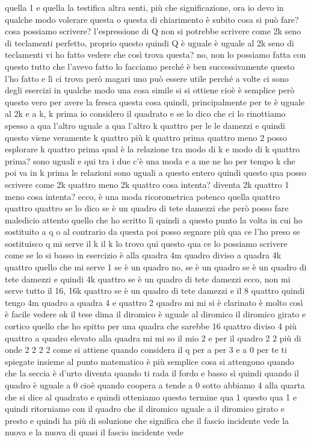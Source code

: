 \begin{soluzione}
{   quella 1 e quella la testifica altra senti, più che significazione, ora io devo in qualche modo volerare questa o questa di chiarimento è subito cosa si può fare? cosa possiamo scrivere? l'espressione di Q non si potrebbe scrivere come 2k seno di teclamenti perfetto, proprio questo quindi Q è uguale è uguale al 2k seno di teclamenti vi ho fatto vedere che così trova questa? no, non lo possiamo fatta con questo tutto che l'avevo fatto lo facciamo perché è ben successivamente questo l'ho fatto e lì ci trova però magari uno può essere utile perché a volte ci sono degli esercizi in qualche modo una cosa simile si si ottiene cioè è semplice però questo vero per avere la fresca questa cosa quindi, principalmente per te è uguale al 2k e a k, k prima io considero il quadrato e se lo dico che ci lo rinottiamo spesso a qua l'altro uguale a qua l'altro k quattro per le le damezzi e quindi questo viene veramente k quattro più k quattro prima quattro meno 2 posso esplorare k quattro prima qual è la relazione tra modo di k e modo di k quattro prima? sono uguali e qui tra i due c'è una moda e a me ne ho per tempo k che poi va in k prima le relazioni sono uguali a questo entero quindi questo qua posso scrivere come 2k quattro meno 2k quattro cosa intenta? diventa 2k quattro 1 meno cosa intenta? ecco, è una moda ricorometrica potenco quella quattro quattro quattro se lo dico se è un quadro di tete damezzi che però posso fare maledicio attento quello che ho scritto lì quindi a questo punto la volta in cui ho sostituito a q o al contrario da questa poi posso segnare più qua ce l'ho preso se sostituisco q mi serve il k il k lo trovo qui questo qua ce lo possiamo scrivere come se lo si basso in esercizio è alla quadra 4m quadro diviso a quadra 4k quattro quello che mi serve 1 se è un quadro no, se è un quadro se è un quadro di tete damezzi e quindi 4k quattro se è un quadro di tete damezzi ecco, non mi serve tutto il 16, 16k quattro se è un quadro di tete damezzi e il 8 quattro quindi tengo 4m quadro a quadra 4 e quattro 2 quadro mi mi si è clarinato è molto così è facile vedere ok il tese dima il diromico è uguale al diromico il diromico girato e cortico quello che ho spitto per una quadra che sarebbe 16 quattro diviso 4 più quattro a quadro elevato alla quadra mi mi so il mio 2 e per il quadro 2 2 più di onde 2 2 2 2 come si attiene quando considera il q per a per 3 e a 0 per te ti spiegate insieme al punto matematico è più semplice cosa si attengono quando che la seccia è d'urto diventa quando ti rada il fordo e basso sì quindi quando il quadro è uguale a 0 cioè quando coopera a tende a 0 sotto abbiamo 4 alla quarta che si dice al quadrato e quindi otteniamo questo termine qua 1 questo qua 1 e quindi ritorniamo con il quadro che il diromico uguale a il diromico girato e presto e quindi ha più di soluzione che significa che il fascio incidente vede la nuova e la nuova di quasi il fascio incidente vede 
   
}
\end{soluzione}
